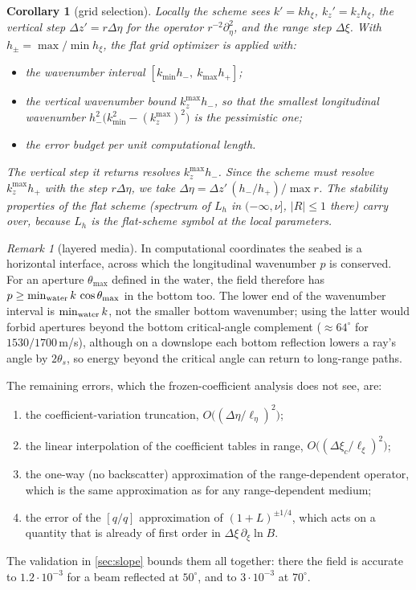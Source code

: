 \documentclass[11pt,a4paper]{article}
\newtheorem{corollary}{Corollary}
\theoremstyle{remark}
\newtheorem{remark}{Remark}
\newcommand{\het}{\nu}
\newcommand{\pd}{\partial}
\begin{document}
\begin{corollary}[grid selection]\label{cor:grid}
Locally the scheme sees $k'=kh_\xi$, $k_z'=k_zh_\xi$, the vertical step
$\Delta z'=r\Delta\eta$ for the operator $r^{-2}\pd^2_\eta$, and the range step
$\Delta\xi$. With $h_\pm=\max/\min h_\xi$, the flat grid optimizer is applied with:
\begin{itemize}
\item the wavenumber interval $[k_{\min}h_-,\ k_{\max}h_+]$;
\item the vertical wavenumber bound $k_z^{\max}h_-$, so that the smallest
longitudinal wavenumber $h_-^2\bigl(k_{\min}^2-(k_z^{\max})^2\bigr)$ is the
pessimistic one;
\item the error budget per unit computational length.
\end{itemize}
The vertical step it returns resolves $k_z^{\max}h_-$. Since the scheme must
resolve $k_z^{\max}h_+$ with the step $r\Delta\eta$, we take
$\Delta\eta=\Delta z'\,(h_-/h_+)/\max r$.
The stability properties of the flat scheme (spectrum of $L_h$ in
$(-\infty,\het]$, $|R|\le1$ there) carry over, because $L_h$ is the flat-scheme
symbol at the local parameters.
\end{corollary}

\begin{remark}[layered media]
In computational coordinates the seabed is a horizontal interface, across which
the longitudinal wavenumber $p$ is conserved. For an aperture $\theta_{\max}$
defined in the water, the field therefore has
$p\ge\min_{\rm water}k\,\cos\theta_{\max}$ in the bottom too. The lower end of
the wavenumber interval is $\min_{\rm water}k$, not the smaller bottom wavenumber;
using the latter would forbid apertures beyond the bottom critical-angle
complement ($\approx64^\circ$ for $1530/1700$\,m/s), although on a downslope
each bottom reflection lowers a ray's angle by $2\theta_s$, so energy beyond the
critical angle can return to long-range paths.
\end{remark}

The remaining errors, which the frozen-coefficient analysis does not see, are:
\begin{enumerate}
\item the coefficient-variation truncation, $O\bigl((\Delta\eta/\ell_\eta)^2\bigr)$;
\item the linear interpolation of the coefficient tables in range, $O\bigl((\Delta\xi_c/\ell_\xi)^2\bigr)$;
\item the one-way (no backscatter) approximation of the range-dependent
operator, which is the same approximation as for any range-dependent medium;
\item the error of the $[q/q]$ approximation of $(1+L)^{\pm1/4}$, which acts on
a quantity that is already of first order in $\Delta\xi\,\pd_\xi\ln B$.
\end{enumerate}
The validation in \cref{sec:slope} bounds them all together: there the field is
accurate to $1.2\cdot10^{-3}$ for a beam reflected at $50^\circ$, and to
$3\cdot10^{-3}$ at $70^\circ$.
\end{document}

